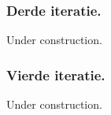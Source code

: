 \subsubsection{Derde iteratie.}
Under construction.

\subsubsection{Vierde iteratie.}
Under construction.

